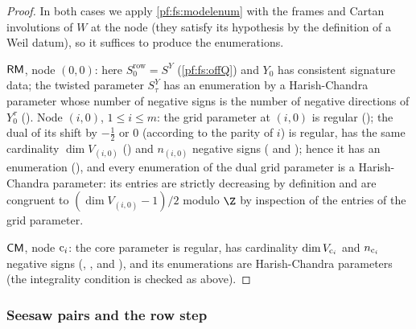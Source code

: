 \begin{proof}
In both cases we apply \cref{pf:fs:modelenum} with the frames and Cartan involutions of $W$ at the node (they satisfy its
hypothesis by the definition of a Weil datum), so it suffices to produce the enumerations.

$\mathsf{RM}$, node $(0,0)$: here $S^{\mathrm{row}}_0=S^Y$ (\cref{pf:fs:offQ}) and $Y_0$ has consistent signature data; the twisted
parameter $S^Y_\tau$ has an enumeration by a Harish-Chandra parameter whose number of negative signs is the number of negative
directions of $Y_0^\tau$ (). Node $(i,0)$, $1\le i\le m$: the grid parameter at
$(i,0)$ is regular (); the dual of its shift by $-\frac12$ or $0$ (according to
the parity of $i$) is regular, has the same cardinality $\dim V_{(i,0)}$ () and
$n_{(i,0)}$ negative signs ( and );
hence it has an enumeration (), and every enumeration of the dual grid
parameter is a Harish-Chandra parameter: its entries are strictly decreasing by definition and are congruent to
$(\dim V_{(i,0)}-1)/2$ modulo $\Z$ by inspection of the entries of the grid parameter.

$\mathsf{CM}$, node $\mathrm{c}_i$: the core parameter is regular, has cardinality $\dim V_{\mathrm{c}_i}$ and $n_{\mathrm{c}_i}$ negative signs
(, , and ),
and its enumerations are Harish-Chandra parameters (the integrality condition is checked as above).
\end{proof}

\subsubsection{Seesaw pairs and the row step}


